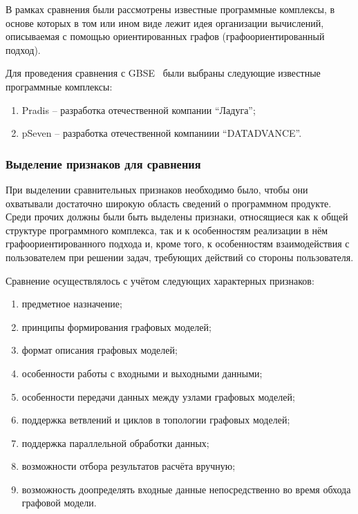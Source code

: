 \def\notedate{2022.02.09}
\def\currentauthor{Тришин И.В. (РК6)}%

В рамках сравнения были рассмотрены известные программные комплексы, в основе которых в том или ином виде лежит идея организации вычислений, описываемая с помощью ориентированных графов (графоориентированный подход).

Для проведения сравнения с GBSE~\cite{SokPersh2018GBSE} были выбраны следующие известные программные комплексы:
\begin{enumerate}
    \item \textsf{Pradis} -- разработка отечественной компании ``Ладуга'';
    \item \textsf{pSeven} -- разработка отечественной компаниии ``DATADVANCE''.
\end{enumerate}

\subsubsection{Выделение признаков для сравнения}

При выделении сравнительных признаков необходимо было, чтобы они охватывали достаточно широкую область сведений о программном продукте. Среди прочих должны были быть выделены признаки, относящиеся как к общей структуре программного комплекса, так и к особенностям реализации в нём графоориентированного подхода и, кроме того, к особенностям взаимодействия с пользователем при решении задач, требующих действий со стороны пользователя.

Сравнение осуществлялось с учётом следующих характерных признаков:
\begin{enumerate}
    \item предметное назначение;
    \item принципы формирования графовых моделей;
    \item формат описания графовых моделей;
    \item особенности работы с входными и выходными данными;
    \item особенности передачи данных между узлами графовых моделей;
    \item поддержка ветвлений и циклов в топологии графовых моделей;
    \item поддержка параллельной обработки данных;
    \item возможности отбора результатов расчёта вручную;
    \item возможность доопределять входные данные непосредственно во время обхода графовой модели.
\end{enumerate}

